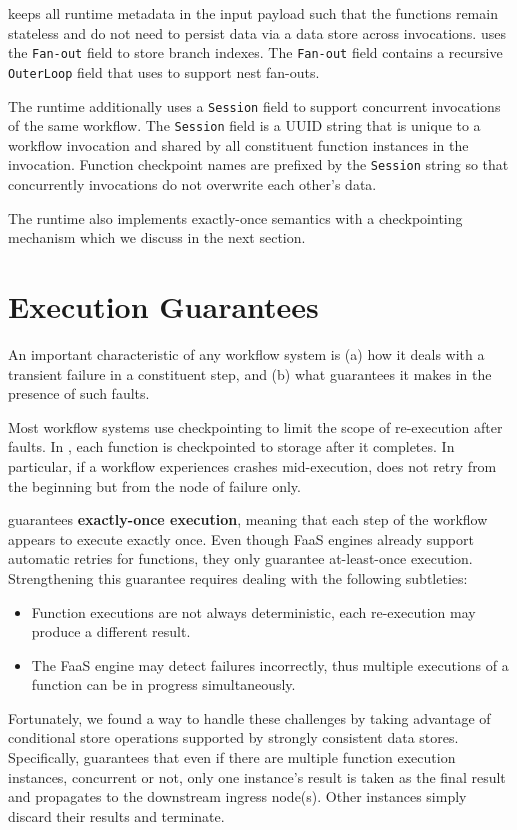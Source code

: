 \name{} keeps all runtime metadata in the input payload such that the
functions remain stateless and do not need to persist data via a data store
across invocations. \name{} uses the \texttt{Fan-out} field to store branch
indexes. The \texttt{Fan-out} field contains a recursive \texttt{OuterLoop}
field that \name{} uses to support nest fan-outs.

The runtime additionally uses a \texttt{Session} field to support concurrent
invocations of the same workflow. The \texttt{Session} field is a UUID string
that is unique to a workflow invocation and shared by all constituent function
instances in the invocation. Function checkpoint names are prefixed by the
\texttt{Session} string so that concurrently invocations do not overwrite each
other's data.

The \name{} runtime also implements exactly-once semantics with a
checkpointing mechanism which we discuss in the next section.


\section{Execution Guarantees}

An important characteristic of any workflow system 
is (a) how it deals with  a transient failure in a constituent step, and 
(b) what guarantees it makes in the presence of such faults.
 
Most workflow systems use checkpointing to limit the scope of re-execution after faults. 
In \name{}, each function is checkpointed to storage after it completes. In particular, if a
workflow experiences crashes mid-execution, \name{} does not retry from the beginning but
from the node of failure only.

\name{} guarantees \textbf{exactly-once execution}, meaning that each step of the 
workflow appears to execute exactly once. Even though FaaS engines already support automatic retries for functions,
they only guarantee at-least-once execution. Strengthening this guarantee requires dealing with the following subtleties:
\begin{itemize}
\item Function executions are not always deterministic, each re-execution may produce a different result.
\item The FaaS engine may detect failures incorrectly, thus multiple executions of a function can be in progress simultaneously.
\end{itemize}

Fortunately, we found a way to handle these challenges by taking advantage of conditional store operations 
supported by strongly consistent data stores. 
Specifically, \name{} guarantees that even if there are
multiple function execution instances, concurrent or not, only one instance's result is
taken as the final result and propagates to the downstream ingress node(s).
Other instances simply discard their results and terminate. 

